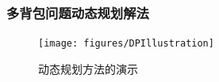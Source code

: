 %
%


\begin{frame}
\frametitle{多背包问题动态规划解法}
\begin{figure}[htbp]
\centering
\texttt{[image: figures/DPIllustration]}\\
  \caption{动态规划方法的演示}\label{fig:DPIllustration}
\end{figure}
\end{frame}

